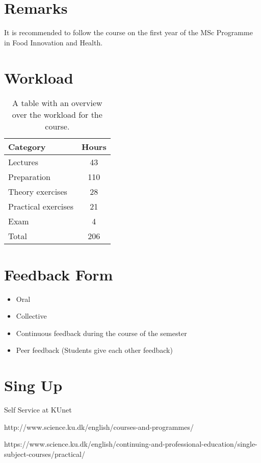 \section{Remarks}
It is recommended to follow the course on the first year of the MSc Programme in Food Innovation and Health.

\section{Workload}
\begin{table}
    \centering
    \caption{A table with an overview over the workload for the course.}
    \label{tab:workload}
    \begin{tabular}{ l | c}
        \textbf{Category} & \textbf{Hours} \\ 
        \hline
        Lectures & 43 \\ 
        Preparation & 110 \\
        Theory exercises & 28 \\ 
        Practical exercises & 21 \\ 
        Exam & 4 \\ 
        \hline
        Total & 206 \\ 
    \end{tabular}
\end{table}

\section{Feedback Form}
\begin{highlight}
    \begin{itemize}
        \item Oral
        \item Collective
        \item Continuous feedback during the course of the semester
        \item Peer feedback (Students give each other feedback)
    \end{itemize}
\end{highlight}

\section{Sing Up}
Self Service at KUnet

http://www.science.ku.dk/english/courses-and-programmes/

https://www.science.ku.dk/english/continuing-and-professional-education/single-subject-courses/practical/

